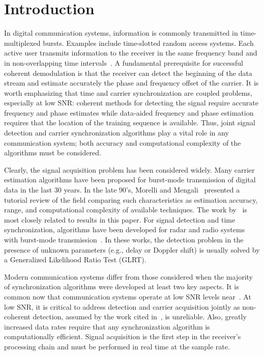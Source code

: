 \section{Introduction}
\label{sec:introduction}

In digital communication systems, information is commonly transmitted in time-multiplexed bursts.
Examples include time-slotted random access systems. Each active user transmits information to the receiver
in the same frequency band and in non-overlapping time intervals~\cite{Falconer_95}. 
A fundamental prerequisite for successful coherent demodulation is that the receiver can
detect the beginning of the data stream and estimate accurately the phase and frequency offset of the carrier.
It is worth emphasizing that time and carrier synchronization are coupled problems, especially at low SNR:
coherent methods for detecting the signal require accurate frequency and phase estimates while
data-aided frequency and phase estimation requires that the location of the training sequence is available.
Thus, joint signal detection and carrier synchronization algorithms play a vital role in any communication system;
both accuracy and computational complexity of the algorithms must be considered.

Clearly, the signal acquisition problem has been considered widely. 
Many carrier estimation algorithms have been proposed for burst-mode
transmission of digital data in the last 30 years.
In the late 90's, Morelli and Mengali~\cite{Morelli_Mengali_98} presented a tutorial review of the field
comparing such characteristics as estimation accuracy, range, and computational complexity of available techniques.
The work by~\cite{Rife_Boorstyn_74,Tretter_85,Kay_89,Luise_Reggiannini_95,Fitz_94,Mengali_Morelli_97} is most
closely related to results in this paper. 
For signal detection and time synchronization, algorithms have been developed for radar and radio
systems with burst-mode transmission~\cite{Kumari_15,Liu_Wei_15,Grossi_Lops_18, Bolisetti_11,Cui_Kong_09,Kumar_Dwivedi_16}.
In these works, the detection problem in the presence of unknown
parameters (e.g., delay or Doppler shift) is usually solved by a Generalized Likelihood Ratio Test (GLRT).

Modern communication systems differ from those considered when the majority of synchronization algorithms were 
developed at least two key aspects. 
It is common now that communication systems operate at low SNR levels near~\dB.
At low SNR, it is critical to address detection and carrier acquisition jointly as non-coherent detection, assumed
by the work cited in~\cite{Morelli_Mengali_98}, is unreliable.
Also, greatly increased data rates require that any synchronization algorithm is computationally efficient.
Signal acquisition is the first step in the receiver's processing chain and must be performed in real time at the sample rate.

